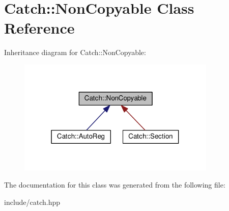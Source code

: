 \hypertarget{classCatch_1_1NonCopyable}{}\section{Catch\+:\+:Non\+Copyable Class Reference}
\label{classCatch_1_1NonCopyable}


Inheritance diagram for Catch\+:\+:Non\+Copyable\+:
\nopagebreak
\begin{figure}[H]
\begin{center}
\leavevmode
\includegraphics[width=268pt]{classCatch_1_1NonCopyable__inherit__graph}
\end{center}
\end{figure}


The documentation for this class was generated from the following file\+:\begin{DoxyCompactItemize}
\item 
include/catch.\+hpp\end{DoxyCompactItemize}
